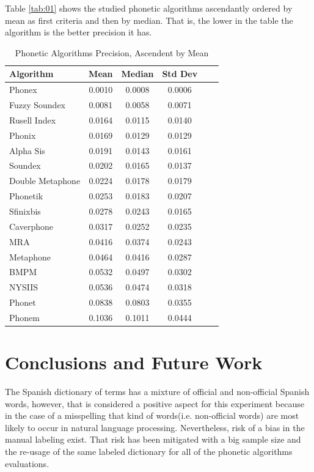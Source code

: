 \documentclass[9pt,conference]{IEEEtran}
\begin{document}
Table \ref{tab:01} shows the studied phonetic algorithms ascendantly ordered by mean
as first criteria and then by median. That is, the lower in the table the algorithm is the
better precision it has.

\begin{table}[H]
\caption{Phonetic Algorithms Precision, Ascendent by Mean} \label{tab:01}
\centering
\centering
\begin{tabular}{ lccccc }\\
\toprule[1.5pt]
	\bf Algorithm & \bf Mean & \bf Median & \bf Std Dev \\ \hline
         Phonex	&0.0010	&0.0008	&0.0006\\
         Fuzzy Soundex	&0.0081	&0.0058	&0.0071\\
         Rusell Index	&0.0164	&0.0115	&0.0140\\
         Phonix	&0.0169	&0.0129	&0.0129\\
         Alpha Sis	&0.0191	&0.0143	&0.0161\\
         Soundex	&0.0202	&0.0165	&0.0137\\
         Double Metaphone	&0.0224	&0.0178	&0.0179\\
         Phonetik	&0.0253	&0.0183	&0.0207\\
         Sfinixbis	&0.0278	&0.0243	&0.0165\\
         Caverphone	&0.0317	&0.0252	&0.0235\\
         MRA	&0.0416	&0.0374	&0.0243\\
         Metaphone	&0.0464	&0.0416	&0.0287\\
         BMPM	&0.0532	&0.0497	&0.0302\\
         NYSIIS	&0.0536	&0.0474	&0.0318\\
         Phonet	&0.0838	&0.0803	&0.0355\\
         Phonem	&0.1036	&0.1011	&0.0444\\
\bottomrule[1.25pt]
\end{tabular}
\label{default}
\end{table}%



\section{Conclusions and Future Work}
The Spanish dictionary of terms has a mixture of official and non-official Spanish words, 
however, that is considered a positive aspect for this experiment because in the case 
of a misspelling that kind of words(i.e. non-official words) are most likely to occur 
in natural language processing. Nevertheless, risk of a bias in the manual labeling exist. 
That risk has been mitigated with a big sample size and the re-usage of the same 
labeled dictionary for all of the phonetic algorithms evaluations.\\
\end{document}

